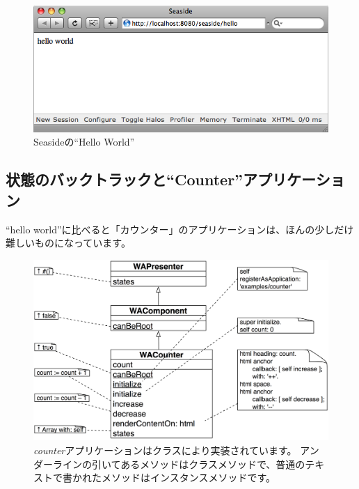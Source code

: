 \documentclass[a4paper,10pt,twoside]{book}
\begin{document}
\begin{figure}[htb]
\begin{center}
\includegraphics[width=\textwidth]{WAHelloWorld}
\caption{Seasideの``Hello World''}
\end{center}
\end{figure}

\subsection{状態のバックトラックと``Counter''アプリケーション}

``hello world''に比べると「カウンター」のアプリケーションは、ほんの少しだけ難しいものになっています。

\begin{figure}[ht]
\begin{center}
\includegraphics[width=\textwidth]{WACounter}
\caption{\emph{counter}アプリケーションはクラスにより実装されています。  アンダーラインの引いてあるメソッドはクラスメソッドで、普通のテキストで書かれたメソッドはインスタンスメソッドです。}
\end{center}
\end{figure}
\end{document}
